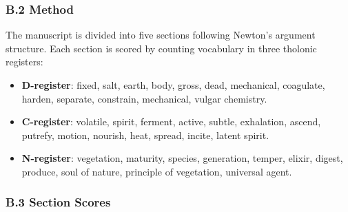 \documentclass[12pt]{article}
\providecommand{\tightlist}{%
  \setlength{\itemsep}{0pt}\setlength{\parskip}{0pt}}
\begin{document}
\subsubsection{B.2 Method}\label{b.2-method}

The manuscript is divided into five sections following Newton's argument
structure. Each section is scored by counting vocabulary in three
tholonic registers:

\begin{itemize}
\tightlist
\item
  \textbf{D-register}: fixed, salt, earth, body, gross, dead,
  mechanical, coagulate, harden, separate, constrain, mechanical, vulgar
  chemistry.
\item
  \textbf{C-register}: volatile, spirit, ferment, active, subtle,
  exhalation, ascend, putrefy, motion, nourish, heat, spread, incite,
  latent spirit.
\item
  \textbf{N-register}: vegetation, maturity, species, generation,
  temper, elixir, digest, produce, soul of nature, principle of
  vegetation, universal agent.
\end{itemize}

\subsubsection{B.3 Section Scores}\label{b.3-section-scores}
\end{document}
